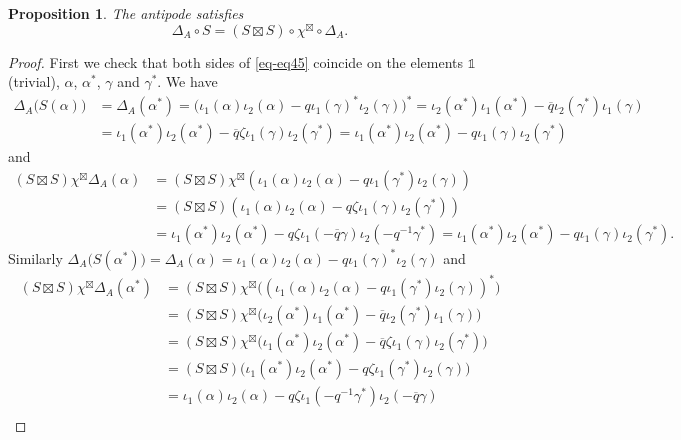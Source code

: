 \documentclass[10pt,a4paper]{amsart}
\newtheorem{proposition}{Proposition}
\newcommand{\I}{\mathds{1}}
\newcommand{\comp}{\circ}
\begin{document}
\begin{proposition}\label{prop-lemma12}
The antipode satisfies
\begin{equation}\label{eq-eq45}
\Delta_A\comp S=(S\boxtimes S)\comp\chi^{\boxtimes}\comp\Delta_A.
\end{equation}
\end{proposition}

\begin{proof}
First we check that both sides of \eqref{eq-eq45} coincide on the elements $\I$ (trivial), $\alpha$, $\alpha^*$, $\gamma$ and $\gamma^*$. We have
\begin{align*}
\Delta_A\bigl(S(\alpha)\bigr)
&=\Delta_A(\alpha^*)
=\bigl(\iota_1(\alpha)\iota_2(\alpha)-q\iota_1(\gamma)^* \iota_2(\gamma)\bigr)^*
=\iota_2(\alpha^*)\iota_1(\alpha^*)-\overline{q}\iota_2(\gamma^*)\iota_1(\gamma)\\
&=\iota_1(\alpha^*)\iota_2(\alpha^*)-\overline{q}\zeta\iota_1(\gamma)\iota_2(\gamma^*)
=\iota_1(\alpha^*)\iota_2(\alpha^*)-q\iota_1(\gamma)\iota_2(\gamma^*)
\end{align*}
and
\begin{align*}
(S\boxtimes S)\chi^{\boxtimes}\Delta_A(\alpha)
&=(S\boxtimes S)\chi^{\boxtimes}(\iota_1(\alpha)\iota_2(\alpha)-q\iota_1(\gamma^*)\iota_2(\gamma))\\
&=(S\boxtimes S)(\iota_1(\alpha)\iota_2(\alpha)-q\zeta\iota_1(\gamma)\iota_2(\gamma^*))\\
&=\iota_1(\alpha^*)\iota_2(\alpha^*)-q\zeta\iota_1(-\overline{q}\gamma)\iota_2(-q^{-1}\gamma^*)
=\iota_1(\alpha^*)\iota_2(\alpha^*)-q\iota_1(\gamma)\iota_2(\gamma^*).
\end{align*}
Similarly $\Delta_A\bigl(S(\alpha^*)\bigr)
=\Delta_A(\alpha)
=\iota_1(\alpha)\iota_2(\alpha)-q\iota_1(\gamma)^*\iota_2(\gamma)$ and
\begin{align*}
(S\boxtimes S)\chi^{\boxtimes}\Delta_A(\alpha^*)
&=(S\boxtimes S)\chi^{\boxtimes}\bigl((\iota_1(\alpha)\iota_2(\alpha)-q\iota_1(\gamma^*)\iota_2(\gamma))^*\bigr)\\
&=(S\boxtimes S)\chi^{\boxtimes}\bigl(\iota_2(\alpha^*)\iota_1(\alpha^*)-\overline{q}\iota_2(\gamma^*)\iota_1(\gamma)\bigr)\\
&=(S\boxtimes S)\chi^{\boxtimes}\bigl(\iota_1(\alpha^*)\iota_2(\alpha^*)-\overline{q}\zeta\iota_1(\gamma)\iota_2(\gamma^*)\bigr)\\
&=(S\boxtimes S)\bigl(\iota_1(\alpha^*)\iota_2(\alpha^*)-q\zeta\iota_1(\gamma^*)\iota_2(\gamma)\bigr)\\
&=\iota_1(\alpha)\iota_2(\alpha)-q\zeta\iota_1(-q^{-1}\gamma^*)\iota_2(-\overline{q}\gamma)\\

\end{align*}
\end{proof}
\end{document}
